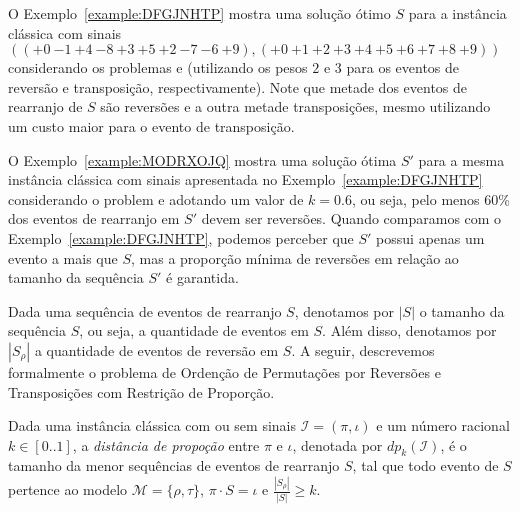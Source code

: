 O Exemplo~\ref{example:DFGJNHTP} mostra uma solução ótimo $S$ para a instância clássica com sinais $(({+0}~{-1}~{+4}~{-8}~{+3}~{+5}~{+2}~{-7}~{-6}~{+9}),({+0}~{+1}~{+2}~{+3}~{+4}~{+5}~{+6}~{+7}~{+8}~{+9}))$ considerando os problemas \SbRT{} e \SbWRT{} (utilizando os pesos $2$ e $3$ para os eventos de reversão e transposição, respectivamente). Note que metade dos eventos de rearranjo de $S$ são reversões e a outra metade transposições, mesmo utilizando um custo maior para o evento de transposição.



O Exemplo~\ref{example:MODRXOJQ} mostra uma solução ótima $S'$ para a mesma instância clássica com sinais apresentada no Exemplo~\ref{example:DFGJNHTP} considerando o problem \SbPRT{} e adotando um valor de $k = 0.6$, ou seja, pelo menos 60\% dos eventos de rearranjo em $S'$ devem ser reversões. Quando comparamos com o Exemplo~\ref{example:DFGJNHTP}, podemos perceber que $S'$ possui apenas um evento a mais que $S$, mas a proporção mínima de reversões em relação ao tamanho da sequência $S'$ é garantida.



Dada uma sequência de eventos de rearranjo $S$, denotamos por $|S|$ o tamanho da sequência $S$, ou seja, a quantidade de eventos em $S$. Além disso, denotamos por $|S_{\rho}|$ a quantidade de eventos de reversão em $S$. A seguir, descrevemos formalmente o problema de Ordenção de Permutações por Reversões e Transposições com Restrição de Proporção.

\begin{task}
\end{task}

Dada uma instância clássica com ou sem sinais $\mathcal{I}=(\pi,\iota)$ e um número racional $k \in [0..1]$, a \emph{distância de propoção} entre $\pi$ e $\iota$, denotada por $dp_{k}(\mathcal{I})$, é o tamanho da menor sequências de eventos de rearranjo $S$, tal que todo evento de $S$ pertence ao modelo $\mathcal{M}=\{\rho,\tau\}$, $\pi \cdot S = \iota$ e $\frac{|S_{\rho}|}{|S|} \ge k$.

